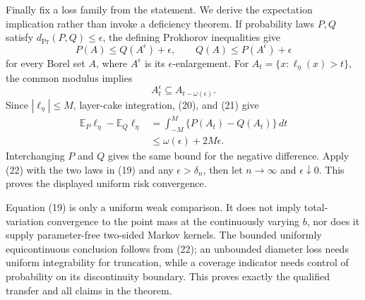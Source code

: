 Finally fix a loss family from the statement. We derive the expectation implication rather than invoke a deficiency theorem. If probability laws \(P,Q\) satisfy \(d_{\mathrm{Pr}}(P,Q)\leq\epsilon\), the defining Prokhorov inequalities give
\[
 P(A)\leq Q(A^\epsilon)+\epsilon,
 \qquad
 Q(A)\leq P(A^\epsilon)+\epsilon
 \tag{20}
\]
for every Borel set \(A\), where \(A^\epsilon\) is its \(\epsilon\)-enlargement. For \(A_t=\{x:\ell_\eta(x)>t\}\), the common modulus implies
\[
 A_t^\epsilon\subseteq A_{t-\omega(\epsilon)}.
 \tag{21}
\]
Since \(|\ell_\eta|\leq M\), layer-cake integration, (20), and (21) give
\[
 \begin{aligned}
 \mathbb E_P\ell_\eta-\mathbb E_Q\ell_\eta
 &=\int_{-M}^{M}\{P(A_t)-Q(A_t)\}\,dt\\
 &\leq\omega(\epsilon)+2M\epsilon.
 \end{aligned}
 \tag{22}
\]
Interchanging \(P\) and \(Q\) gives the same bound for the negative difference. Apply (22) with the two laws in (19) and any \(\epsilon>\delta_n\), then let \(n\to\infty\) and \(\epsilon\downarrow0\). This proves the displayed uniform risk convergence.

Equation (19) is only a uniform weak comparison. It does not imply total-variation convergence to the point mass at the continuously varying \(b\), nor does it supply parameter-free two-sided Markov kernels. The bounded uniformly equicontinuous conclusion follows from (22); an unbounded diameter loss needs uniform integrability for truncation, while a coverage indicator needs control of probability on its discontinuity boundary. This proves exactly the qualified transfer and all claims in the theorem.
